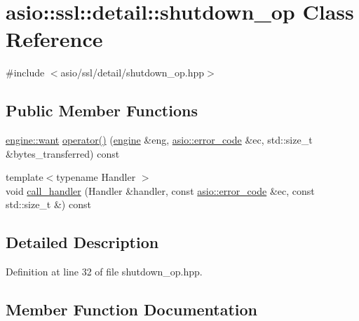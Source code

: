 \hypertarget{classasio_1_1ssl_1_1detail_1_1shutdown__op}{}\section{asio\+:\+:ssl\+:\+:detail\+:\+:shutdown\+\_\+op Class Reference}
\label{classasio_1_1ssl_1_1detail_1_1shutdown__op}


{\ttfamily \#include $<$asio/ssl/detail/shutdown\+\_\+op.\+hpp$>$}

\subsection*{Public Member Functions}
\begin{DoxyCompactItemize}
\item 
\hyperlink{classasio_1_1ssl_1_1detail_1_1engine_ab9812153941a6a93c9095f4e5ca8f915}{engine\+::want} \hyperlink{classasio_1_1ssl_1_1detail_1_1shutdown__op_ac405d44c5a25b87aad877f2b437efd3f}{operator()} (\hyperlink{classasio_1_1ssl_1_1detail_1_1engine}{engine} \&eng, \hyperlink{classasio_1_1error__code}{asio\+::error\+\_\+code} \&ec, std\+::size\+\_\+t \&bytes\+\_\+transferred) const 
\item 
{\footnotesize template$<$typename Handler $>$ }\\void \hyperlink{classasio_1_1ssl_1_1detail_1_1shutdown__op_a935d2d5686ac2ea17cc4f3e21835ef0a}{call\+\_\+handler} (Handler \&handler, const \hyperlink{classasio_1_1error__code}{asio\+::error\+\_\+code} \&ec, const std\+::size\+\_\+t \&) const 
\end{DoxyCompactItemize}


\subsection{Detailed Description}


Definition at line 32 of file shutdown\+\_\+op.\+hpp.



\subsection{Member Function Documentation}
\hypertarget{classasio_1_1ssl_1_1detail_1_1shutdown__op_a935d2d5686ac2ea17cc4f3e21835ef0a}{}
